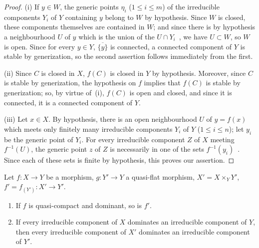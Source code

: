 \begin{proof}
(i) If $y\in W$, the generic points $\eta_i$ ($1\leq i\leq m$) of the irreducible components $Y_i$ of $Y$ containing $y$ belong to $W$ by hypothesis.
Since $W$ is closed, these components themselves are contained in $W$; and since there is by hypothesis a neighbourhood $U$ of $y$ which is the union of the $U\cap Y_i$~, we have $U\subset W$, so $W$ is open.
Since for every $y\in Y$, $\overline{\{y\}}$ is connected, a connected component of $Y$ is stable by generization, so the second assertion follows immediately from the first.

(ii) Since $C$ is closed in $X$, $f(C)$ is closed in $Y$ by hypothesis.
Moreover, since $C$ is stable by generization, the hypothesis on $f$ implies that $f(C)$ is stable by generization; so, by virtue of~(i), $f(C)$ is open and closed, and since it is connected, it is a connected component of $Y$.

(iii) Let $x\in X$.
By hypothesis, there is an open neighbourhood $U$ of $y=f(x)$ which meets only finitely many irreducible components $Y_i$ of $Y$ ($1\leq i\leq n$); let $y_i$ be the generic point of $Y_i$.
For every irreducible component $Z$ of $X$ meeting $f^{-1}(U)$, the generic point $z$ of $Z$ is necessarily in one of the sets $f^{-1}(y_i)$~.
Since each of these sets is finite by hypothesis, this proves our assertion.
\end{proof}

\begin{proposition}[2.3.7]
\label{IV.2.3.7}
Let $f:X\to Y$ be a morphism, $g:Y'\to Y$ a quasi-flat morphism, $X'=X\times_Y Y'$, $f'=f_{(Y')}:X'\to Y'$.
\begin{enumerate}
  \item[(i)] If $f$ is quasi-compact and dominant, so is $f'$.
  \item[(ii)] If every irreducible component of $X$ dominates an irreducible component of $Y$, then every irreducible component of $X'$ dominates an irreducible component of $Y'$.
\end{enumerate}
\end{proposition}

